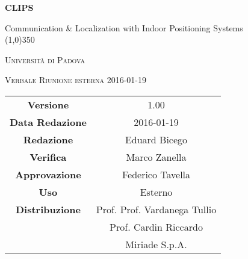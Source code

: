 \documentclass[a4paper,12pt]{article}
\author{Eduard Bicego}
\date{19/01/2016}
\begin{document}
\begin{titlepage}
	\centering
	{\huge\bfseries CLIPS\par}
	Communication \& Localization with Indoor Positioning Systems \\
	\line(1,0){350} \\
	{\scshape\LARGE Università di Padova \par}
	\vspace{1cm}
	{\scshape\Large Verbale Riunione esterna 2016-01-19 \par}
	\logo
	\newpage
	\begin{tabular}{c|c}
		{\hfill \textbf{Versione}} 			& 1.00				\\ 
		{\hfill\textbf{Data Redazione}} 	& 2016-01-19  		\\ 
		{\hfill\textbf{Redazione}} 			& Eduard Bicego		 \\
		{\hfill\textbf{Verifica}} 			& Marco Zanella		\\ 
		{\hfill\textbf{Approvazione}} 		& Federico Tavella	\\ 
		{\hfill\textbf{Uso}} 				& Esterno			\\ 
		{\hfill\textbf{Distribuzione}} 		& Prof. Prof. Vardanega Tullio \\
											& Prof. Cardin Riccardo \\
											& Miriade S.p.A. \\ 
	\end{tabular}
\end{titlepage}
	
	\newpage

	
	\label{LastFrontPage}
	

	\newpage
	
	\pagestyle{mymain}
	
	
		

	
		
	
	\newpage
		
	
	\newpage
		
				
	\label{LastPage}
\end{document}
